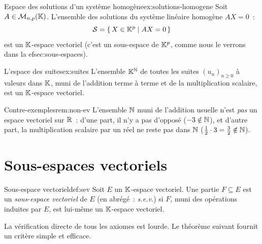 \begin{example}{Espace des solutions d'un système homogène}{ex:solutions-homogene}
  Soit $A\in\mathcal{M}_{n,p}({\mathbb{K}})$. L'ensemble des solutions du système
  linéaire homogène $AX=0$~:
  \[
    {\mathcal{S}} = \left\{\,X\in{\mathbb{K}}^p\;\middle|\;AX=0\,\right\}
  \]
  est un ${\mathbb{K}}$-espace vectoriel (c'est un sous-espace de ${\mathbb{K}}^p$,
  comme nous le verrons dans la 
ef{sec:sous-espaces}).
\end{example}

\begin{example}{L'espace des suites}{ex:suites}
  L'ensemble ${\mathbb{K}}^{\mathbb{N}}$ de toutes les suites $(u_n)_{n\geq 0}$ à valeurs
  dans ${\mathbb{K}}$, muni de l'addition terme à terme et de la multiplication
  scalaire, est un ${\mathbb{K}}$-espace vectoriel.
\end{example}

\begin{remark}{Contre-exemples}{rem:non-ev}
  L'ensemble ${\mathbb{N}}$ muni de l'addition usuelle n'est \emph{pas} un espace
  vectoriel sur ${\mathbb{R}}$~: d'une part, il n'y a pas d'opposé ($-3\notin{\mathbb{N}}$),
  et d'autre part, la multiplication scalaire par un réel ne reste pas
  dans ${\mathbb{N}}$ ($\frac{1}{2}\cdot 3 = \frac{3}{2}\notin{\mathbb{N}}$).
\end{remark}

\section{Sous-espaces vectoriels}\label{sec:sous-espaces}

\begin{definition}{Sous-espace vectoriel}{def:sev}
  Soit $E$ un ${\mathbb{K}}$-espace vectoriel. Une partie $F\subseteq E$ est un
  \emph{sous-espace vectoriel} de $E$
  (en abrégé~: \emph{s.e.v.}) si $F$, muni des opérations induites par
  $E$, est lui-même un ${\mathbb{K}}$-espace vectoriel.
\end{definition}

La vérification directe de tous les axiomes est lourde. Le théorème
suivant fournit un critère simple et efficace.

